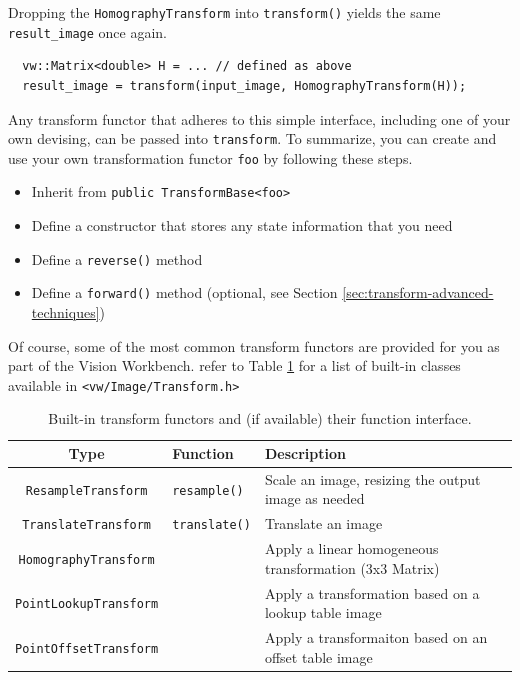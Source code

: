 Dropping the \verb#HomographyTransform# into \verb#transform()# yields
the same \verb#result_image# once again.

\begin{verbatim} 
  vw::Matrix<double> H = ... // defined as above
  result_image = transform(input_image, HomographyTransform(H));
\end{verbatim}

Any transform functor that adheres to this simple interface, including
one of your own devising, can be passed into \verb#transform#.  To
summarize, you can create and use your own transformation functor
\verb#foo# by following these steps.
\begin{itemize}
\item Inherit from \verb#public TransformBase<foo>#
\item Define a constructor that stores any state information that you need
\item Define a \verb#reverse()# method 
\item Define a \verb#forward()# method (optional, see Section \ref{sec:transform-advanced-techniques})
\end{itemize}

Of course, some of the most common transform functors are provided for
you as part of the Vision Workbench.  refer to Table
\ref{tbl:transform-functors} for a list of built-in classes available
in \verb#<vw/Image/Transform.h>#

\begin{table}[tbh]\begin{centering}
\begin{tabular}{|c|l|l|} \hline
Type & Function & Description \\ \hline \hline
\verb#ResampleTransform# & \verb#resample()# & Scale an image, resizing the output image as needed \\ \hline
\verb#TranslateTransform# & \verb#translate()# & Translate an image \\ \hline
\verb#HomographyTransform# & & Apply a linear homogeneous transformation (3x3 Matrix)  \\ \hline
\verb#PointLookupTransform# & & Apply a transformation based on a lookup table image  \\ \hline
\verb#PointOffsetTransform# & & Apply a transformaiton based on an offset table image \\ \hline
\end{tabular}
\caption{Built-in transform functors and (if available) their function interface.}
\label{tbl:transform-functors}
\end{centering}\end{table}

